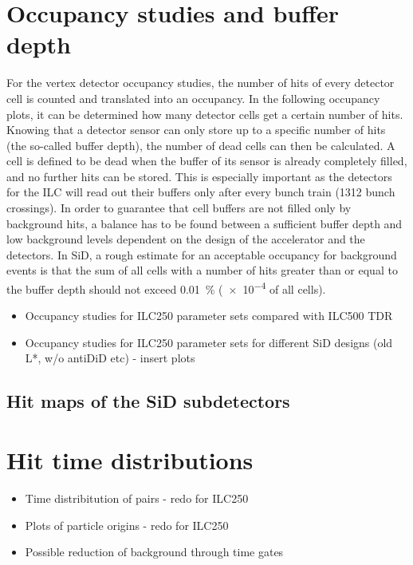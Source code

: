 \section{Occupancy studies and buffer depth}
\label{PairBkg:occupancy}
For the vertex detector occupancy studies, the number of hits of every detector cell is counted and translated into an occupancy.
In the following occupancy plots, it can be determined how many detector cells get a certain number of hits.
Knowing that a detector sensor can only store up to a specific number of hits (the so-called buffer depth), the number of dead cells can then be calculated.
A cell is defined to be dead when the buffer of its sensor is already completely filled, and no further hits can be stored.
This is especially important as the detectors for the ILC will read out their buffers only after every bunch train (1312 bunch crossings).
In order to guarantee that cell buffers are not filled only by background hits, a balance has to be found between a sufficient buffer depth and low background levels dependent on the design of the accelerator and the detectors.
In SiD, a rough estimate for an acceptable occupancy for background events is that the sum of all cells with a number of hits greater than or equal to the buffer depth should not exceed \SI{0.01}{\percent} (\num{e-4} of all cells). 
\begin{itemize}
 \item Occupancy studies for ILC250 parameter sets compared with ILC500 TDR
 \item Occupancy studies for ILC250 parameter sets for different SiD designs (old L*, w/o antiDiD etc) - insert plots
\end{itemize}

\subsection{Hit maps of the SiD subdetectors}
\label{PairBkg:hitmaps}


\section{Hit time distributions}
\label{PairBkg:hittime}

\begin{itemize}
 \item Time distribitution of pairs - redo for ILC250
 \item Plots of particle origins - redo for ILC250
 \item Possible reduction of background through time gates
\end{itemize}

